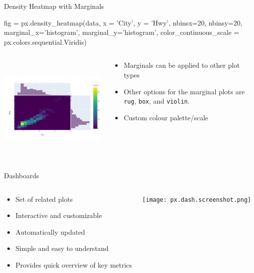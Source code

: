 \documentclass[ignorenonframetext,xcolor=x11names]{beamer}
\begin{document}
\begin{frame}[fragile]{Density Heatmap with Marginals}
\scriptsize
\begin{pythoncode}
fig = px.density_heatmap(data,
  x = 'City', y = 'Hwy',
  nbinsx=20, nbinsy=20,
  marginal_x='histogram', marginal_y='histogram',
  color_continuous_scale = px.colors.sequential.Viridis)
\end{pythoncode}
\begin{columns}
\begin{column}{.65\textwidth}
  \includegraphics[height=2in]{px.heatmap.pdf}
\end{column}
\begin{column}{.35\textwidth}
\footnotesize
  \begin{itemize}
     \item Marginals can be applied to other plot types
     \item Other options for the marginal plots are \texttt{rug}, \texttt{box}, and \texttt{violin}.
     \item Custom colour palette/scale
   \end{itemize}
\end{column}
\end{columns}
\end{frame}

\begin{frame}{Dashboards}
\begin{columns}
\begin{column}{.35\textwidth}
\footnotesize
\begin{itemize}
   \item Set of related plots
   \item Interactive and customizable
   \item Automatically updated
   \item Simple and easy to understand
   \item Provides quick overview of key metrics
\end{itemize}
\end{column}
\begin{column}{.65\textwidth}
  \texttt{[image: px.dash.screenshot.png]}
\end{column}
\end{columns}
\end{frame}
\end{document}
